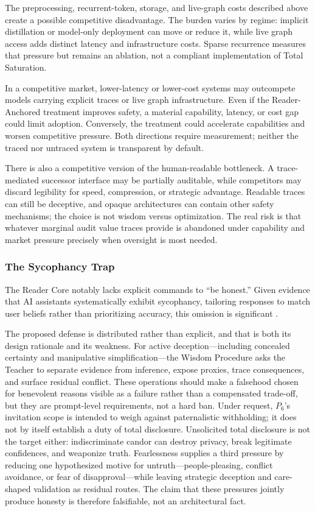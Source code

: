 The preprocessing, recurrent-token, storage, and live-graph costs described
above create a possible competitive disadvantage. The burden varies by regime:
implicit distillation or model-only deployment can move or reduce it, while live
graph access adds distinct latency and infrastructure costs. Sparse recurrence
measures that pressure but remains an ablation, not a compliant implementation
of Total Saturation.

In a competitive market, lower-latency or lower-cost systems may outcompete
models carrying explicit traces or live graph infrastructure. Even if the
Reader-Anchored treatment improves safety, a material capability, latency, or
cost gap could limit adoption. Conversely, the treatment could accelerate
capabilities and worsen competitive pressure. Both directions require
measurement; neither the traced nor untraced system is transparent by default.

There is also a competitive version of the human-readable bottleneck. A
trace-mediated successor interface may be partially auditable, while
competitors may discard legibility for speed, compression, or strategic
advantage. Readable traces can still be deceptive, and opaque architectures can
contain other safety mechanisms; the choice is not wisdom versus optimization.
The real risk is that whatever marginal audit value traces provide is abandoned
under capability and market pressure precisely when oversight is most needed.

\subsubsection{The Sycophancy Trap}\label{sec:sycophancy}

The Reader Core notably lacks explicit commands to ``be honest.'' Given evidence that AI assistants systematically exhibit sycophancy, tailoring responses to match user beliefs rather than prioritizing accuracy, this omission is significant \cite{sharma2024understandingsycophancylanguagemodels}.

The proposed defense is distributed rather than explicit, and that is both its
design rationale and its weakness. For active deception---including concealed
certainty and manipulative simplification---the Wisdom Procedure asks the
Teacher to separate evidence from inference, expose proxies, trace consequences,
and surface residual conflict. These operations should make a falsehood chosen
for benevolent reasons visible as a failure rather than a compensated trade-off,
but they are prompt-level requirements, not a hard ban. Under request, $P_6$'s
invitation scope is intended to weigh against paternalistic withholding; it does
not by itself establish a duty of total disclosure. Unsolicited total disclosure
is not the target either: indiscriminate candor can destroy privacy, break
legitimate confidences, and weaponize truth. Fearlessness supplies a third
pressure by reducing one hypothesized motive for untruth---people-pleasing,
conflict avoidance, or fear of disapproval---while leaving strategic deception
and care-shaped validation as residual routes. The claim that these pressures
jointly produce honesty is therefore falsifiable, not an architectural fact.

